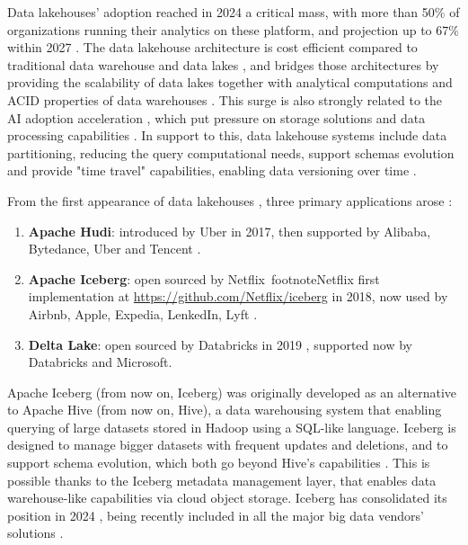 Data lakehouses' adoption reached in 2024 a critical mass, with more than 50\% of organizations running their analytics on these platform, and projection up to 67\% within 2027 \cite{StateDataLakehouse2025}. The data lakehouse architecture \cite{lakehouse2021} is cost efficient compared to traditional data warehouse and data lakes \cite{DatalakehouseCostEfficiency}, and bridges those architectures by providing the scalability of data lakes together with analytical computations and \gls{ACID} properties of data warehouses \cite{lakehouse2021}. This surge is also strongly related to the AI adoption acceleration \cite{SurgeAI2024}, which put pressure on storage solutions and data processing capabilities \cite{StateDataLakehouse2025}. In support to this, data lakehouse systems include data partitioning, reducing the query computational needs, support schemas evolution and provide "time travel" capabilities, enabling data versioning over time \cite{crociDataLakehouseHype2022}.

From the first appearance of data lakehouses \cite{WhatLakehouse2020}, three primary applications arose \cite{ApacheHudiVs}: 
\begin{enumerate} 
    \item \textbf{Apache Hudi}: introduced by Uber in 2017, then supported by Alibaba, Bytedance, Uber and Tencent \cite{rajaperumalUberEngineeringIncremental2017}.
    \item \textbf{Apache Iceberg}: open sourced by Netflix~footnote{Netflix first implementation at \url{https://github.com/Netflix/iceberg}} in 2018, now used by Airbnb, Apple, Expedia, LenkedIn, Lyft \cite{IcebergExamples2024}.
    \item \textbf{Delta Lake}: open sourced by Databricks in 2019 \cite{armbrustDeltaLakeHighperformance2020}, supported now by Databricks and Microsoft.
\end{enumerate}

Apache Iceberg (from now on, Iceberg) was originally developed as an alternative to Apache Hive (from now on, Hive), a data warehousing system that enabling querying of large datasets stored in Hadoop using a SQL-like language. Iceberg is designed to manage bigger datasets with frequent updates and deletions, and to support schema evolution, which both go beyond Hive's capabilities \cite{shiranApacheIcebergDefinitive2024}. This is possible thanks to the Iceberg metadata management layer, that enables data warehouse-like capabilities via cloud object storage. Iceberg has consolidated its position in 2024 \cite{IcebergNewHadoop}, being recently included in all the major big data vendors' solutions \cite{BigDataVendorIceberg}.

